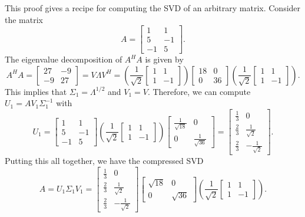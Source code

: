 This proof gives a recipe for computing the SVD of an arbitrary matrix.
Consider the matrix 
\[ A = \left[ \begin{array}{cc}
1 & 1 \\
5 & -1 \\
-1 & 5 
\end{array} \right]. \]
The eigenvalue decomposition of $A^H A$ is given by
\[ A^H A = \left[ \begin{array}{cc}
27 & -9 \\
-9 & 27
\end{array} \right]
= V \Lambda V^H
= \left( \frac{1}{\sqrt{2}}\left[ \begin{array}{cc}
1 & 1 \\
1 & -1 
\end{array} \right] \right)
\left[ \begin{array}{cc}
18 & 0 \\
0 & 36
\end{array} \right]
\left( \frac{1}{\sqrt{2}} \left[ \begin{array}{cc}
1 & 1 \\
1 & -1 
\end{array} \right] \right).
\]
This implies that $\Sigma_1 = \Lambda^{1/2}$ and $V_1 = V$.
Therefore, we can compute $U_1 = A V_1 \Sigma_1^{-1}$ with
\[ U_1 = \left[ \begin{array}{cc}
1 & 1 \\
5 & -1 \\
-1 & 5 
\end{array} \right]
\left( \frac{1}{\sqrt{2}} \left[ \begin{array}{cc}
1 & 1 \\
1 & -1
\end{array} \right] \right)
\left[ \begin{array}{cc}
\frac{1}{\sqrt{18}} & 0 \\
0 & \frac{1}{\sqrt{36}}
\end{array} \right]
= \left[ \begin{array}{cc}
\frac{1}{3} & 0 \\
\frac{2}{3} & \frac{1}{\sqrt{2}} \\
\frac{2}{3} & -\frac{1}{\sqrt{2}}
\end{array} \right]. \]
Putting this all together, we have the compressed SVD
\[ A = U_1 \Sigma_1 V_1 =
\left[ \begin{array}{cc}
\frac{1}{3} & 0 \\
\frac{2}{3} & \frac{1}{\sqrt{2}} \\
\frac{2}{3} & -\frac{1}{\sqrt{2}}
\end{array} \right]
\left[ \begin{array}{cc}
\sqrt{18} & 0 \\
0 & \sqrt{36}
\end{array} \right]
\left( \frac{1}{\sqrt{2}} \left[ \begin{array}{cc}
1 & 1 \\
1 & -1 
\end{array} \right] \right). \]


